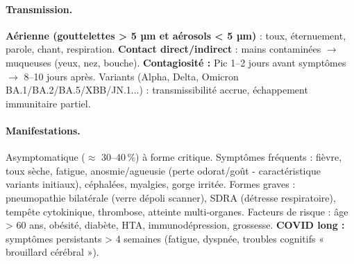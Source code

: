\documentclass[11pt]{article}
\begin{document}
\paragraph{Transmission.}
\textbf{Aérienne (gouttelettes > 5 µm et aérosols < 5 µm)} : toux, éternuement, parole, chant, respiration. \textbf{Contact direct/indirect} : mains contaminées $\to$ muqueuses (yeux, nez, bouche). \textbf{Contagiosité :} Pic 1--2 jours avant symptômes $\to$ 8--10 jours après. Variants (Alpha, Delta, Omicron BA.1/BA.2/BA.5/XBB/JN.1...) : transmissibilité accrue, échappement immunitaire partiel.

\paragraph{Manifestations.}
Asymptomatique ($\approx$ 30--40\,\%) à forme critique. Symptômes fréquents : fièvre, toux sèche, fatigue, anosmie/agueusie (perte odorat/goût - caractéristique variants initiaux), céphalées, myalgies, gorge irritée. Formes graves : pneumopathie bilatérale (verre dépoli scanner), SDRA (détresse respiratoire), tempête cytokinique, thrombose, atteinte multi-organes. Facteurs de risque : âge > 60 ans, obésité, diabète, HTA, immunodépression, grossesse.
\textbf{COVID long :} symptômes persistants > 4 semaines (fatigue, dyspnée, troubles cognitifs « brouillard cérébral »).
\end{document}
